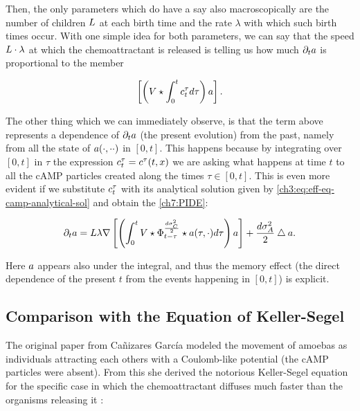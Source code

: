 Then, the only parameters which do have a say also macroscopically are the number of children $L$ at each birth time and the rate $\lambda$ with which such birth times occur.
With one simple idea for both parameters, we can say that the speed $L \cdot \lambda$ at which the chemoattractant is released is telling us how much $\partial_t a$ is proportional to the member

\begin{equation*}
	\left[ \left( V
	\star \int_0^t c_t^\tau 	d \tau
	\right)
	a
	\right].
\end{equation*}

The other thing which we can immediately observe, is that the term above represents a dependence of $\partial_t a$ (the present evolution) from the past, namely from all the state of $a(\cdot,\cdot\cdot)$ in $[0,t]$.
This happens because by integrating over $[0,t]$ in $\tau$ the expression $c_t^\tau = c^\tau (t,x) $ we are asking what happens at time $t$ to all the cAMP particles created along the times $\tau\in[0,t]$.
This is even more evident if we substitute $c_t^\tau$ with its analytical solution given by \ref{ch3:eq:eff-eq-camp-analytical-sol} and obtain the \PIDE \ref{ch7:PIDE}:

\begin{equation*}
	\partial_t a =  L\lambda \nabla \left[ \left( \int_0^t
	V \star \Phi_{t-\tau}^{\frac{d\sigma_C^2}{2}} \star a(\tau, \cdot) 
	d \tau
	\right)
	a
	\right]
	+ \frac{d\sigma_A^2}{2} \bigtriangleup a.
\end{equation*}

Here $a$ appears also under the integral, and thus the memory effect (the direct dependence of the present $t$ from the events happening in $[0,t]$) is explicit.

\subsection{Comparison with the Equation of Keller-Segel}

The original paper from Cañizares García \cite{ana} modeled the movement of amoebas as individuals attracting each others with a Coulomb-like potential (the cAMP particles were absent). From this she derived the notorious Keller-Segel equation \cite{keller-segel} for the specific case in which the chemoattractant diffuses much faster than the organisms releasing it \cite{jaeger-luckhaus}:

